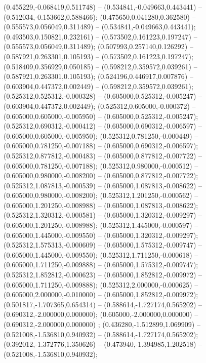  (0.455229,-0.068419,0.511748) -- (0.534841,-0.049663,0.443441) -- (0.512034,-0.153662,0.588466);
 (0.475650,0.041280,0.362580) -- (0.555573,0.056049,0.311489) -- (0.534841,-0.049663,0.443441);
 (0.493503,0.150821,0.232161) -- (0.573502,0.161223,0.197247) -- (0.555573,0.056049,0.311489);
 (0.507993,0.257140,0.126292) -- (0.587921,0.263301,0.105193) -- (0.573502,0.161223,0.197247);
 (0.518409,0.356929,0.050185) -- (0.598212,0.359572,0.039261) -- (0.587921,0.263301,0.105193);
 (0.524196,0.446917,0.007876) -- (0.603904,0.447372,0.002449) -- (0.598212,0.359572,0.039261);
 (0.525312,0.525312,-0.000328) -- (0.605000,0.525312,-0.005247) -- (0.603904,0.447372,0.002449);
 (0.525312,0.605000,-0.000372) -- (0.605000,0.605000,-0.005950) -- (0.605000,0.525312,-0.005247);
 (0.525312,0.690312,-0.000412) -- (0.605000,0.690312,-0.006597) -- (0.605000,0.605000,-0.005950);
 (0.525312,0.781250,-0.000449) -- (0.605000,0.781250,-0.007188) -- (0.605000,0.690312,-0.006597);
 (0.525312,0.877812,-0.000483) -- (0.605000,0.877812,-0.007722) -- (0.605000,0.781250,-0.007188);
 (0.525312,0.980000,-0.000512) -- (0.605000,0.980000,-0.008200) -- (0.605000,0.877812,-0.007722);
 (0.525312,1.087813,-0.000539) -- (0.605000,1.087813,-0.008622) -- (0.605000,0.980000,-0.008200);
 (0.525312,1.201250,-0.000562) -- (0.605000,1.201250,-0.008988) -- (0.605000,1.087813,-0.008622);
 (0.525312,1.320312,-0.000581) -- (0.605000,1.320312,-0.009297) -- (0.605000,1.201250,-0.008988);
 (0.525312,1.445000,-0.000597) -- (0.605000,1.445000,-0.009550) -- (0.605000,1.320312,-0.009297);
 (0.525312,1.575313,-0.000609) -- (0.605000,1.575312,-0.009747) -- (0.605000,1.445000,-0.009550);
 (0.525312,1.711250,-0.000618) -- (0.605000,1.711250,-0.009888) -- (0.605000,1.575312,-0.009747);
 (0.525312,1.852812,-0.000623) -- (0.605000,1.852812,-0.009972) -- (0.605000,1.711250,-0.009888);
 (0.525312,2.000000,-0.000625) -- (0.605000,2.000000,-0.010000) -- (0.605000,1.852812,-0.009972);
 (0.501817,-1.707365,0.654314) -- (0.588614,-1.727174,0.565202) -- (0.690312,-2.000000,0.000000);
 (0.605000,-2.000000,0.000000) -- (0.690312,-2.000000,0.000000) ;
 (0.436280,-1.512899,1.069909) -- (0.521008,-1.536810,0.940932) -- (0.588614,-1.727174,0.565202);
 (0.392012,-1.372776,1.350626) -- (0.473940,-1.394985,1.202518) -- (0.521008,-1.536810,0.940932);
